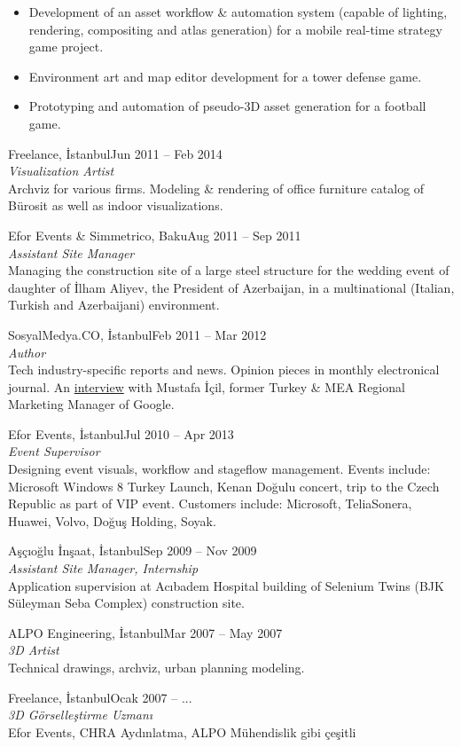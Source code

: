 \documentclass[8pt]{scrartcl}
\newenvironment{xplist}{%
  \setlist{nosep}
  \newcommand\xpitem[4]{%
    {\color[HTML]{801040}%
      \sc##2\hfill ##1}\\[2pt]
    {\Large\textit{##3}
      \smallskip} \\%
    {##4\bigskip}%

  }}%
{\setlist{}}
\begin{document}
\begin{xplist}
{{      \begin{itemize}
      \item  Development of  an  asset workflow  \& automation  system
        (capable  of   lighting,  rendering,  compositing   and  atlas
        generation) for a mobile real-time strategy game project.
      \item Environment  art and  map editor  development for  a tower
        defense game.
      \item Prototyping  and automation of pseudo-3D  asset generation
        for a football game.
      \end{itemize}}%
    \xpitem%
    {Jun 2011 -- Feb 2014}%
    {Freelance, İstanbul}%
    {Visualization Artist}{%
      Archviz  for various  firms.   Modeling \&  rendering of  office
      furniture catalog of Bürosit as well as indoor visualizations.}%
    \xpitem%
    {Aug 2011 -- Sep 2011}%
    {Efor Events \& Simmetrico, Baku}%
    {Assistant Site Manager}{%
      Managing the  construction site of  a large steel  structure for
      the wedding event of daughter  of İlham Aliyev, the President of
      Azerbaijan,   in   a   multinational   (Italian,   Turkish   and
      Azerbaijani) environment.}%
    \xpitem%
    {Feb 2011 -- Mar 2012}%
    {SosyalMedya.CO, İstanbul}%
    {Author}{%
      Tech  industry-specific reports  and  news.   Opinion pieces  in
      monthly           electronical            journal.            An
      \href{http://sosyalmedya.co/google-mustafa-icil/}{interview}
      with  Mustafa  İçil, former  Turkey  \&  MEA Regional  Marketing
      Manager of Google.}%
    \xpitem%
    {Jul 2010 -- Apr 2013}%
    {Efor Events, İstanbul}%
    {Event Supervisor}{%
      Designing  event  visuals,  workflow and  stageflow  management.
      Events include: Microsoft Windows  8 Turkey Launch, Kenan Doğulu
      concert,  trip to  the  Czech  Republic as  part  of VIP  event.
      Customers include: Microsoft,  TeliaSonera, Huawei, Volvo, Doğuş
      Holding, Soyak.}%
    \xpitem%
    {Sep 2009 -- Nov 2009}%
    {Aşçıoğlu İnşaat, İstanbul}%
    {Assistant Site Manager, Internship}{%
      Application  supervision   at  Acıbadem  Hospital   building  of
      Selenium Twins (BJK Süleyman Seba Complex) construction site.}%
    \xpitem%
    {Mar 2007 -- May 2007}%
    {ALPO Engineering, İstanbul}%
    {3D Artist}{%
      Technical drawings, archviz, urban planning modeling.}}%
  {%
    \xpitem%
    {Ocak 2007 -- ...}%
    {Freelance, İstanbul}%
    {3D Görselleştirme Uzmanı}{%
      Efor  Events, CHRA  Aydınlatma,  ALPO  Mühendislik gibi  çeşitli
}}
\end{xplist}
\end{document}
